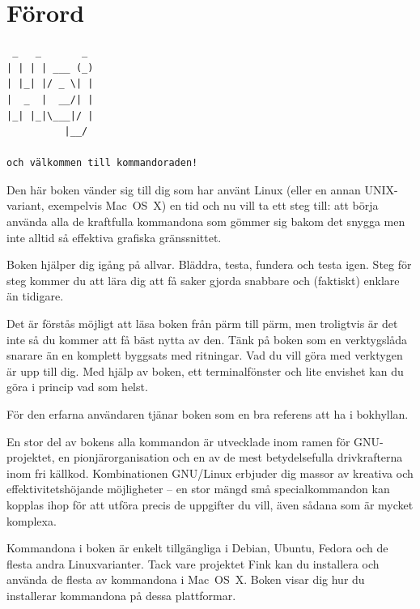 \documentclass[10pt,a4paper,final]{book}
\begin{document}
\newpage 

\pagestyle{plain}

\tableofcontents

\clearpage

\thispagestyle{empty}

\mainmatter

\chapter{Förord}

\begin{verbatim}
 _   _       _
| | | | ___ (_)
| |_| |/ _ \| |
|  _  |  __/| |
|_| |_|\___|/ |
          |__/ 

och välkommen till kommandoraden!
\end{verbatim}

Den här boken vänder sig till dig som har använt Linux (eller en annan UNIX-variant, exempelvis Mac~OS~X) en tid och nu vill ta ett steg till: att börja använda alla de kraftfulla kommandona som gömmer sig bakom det snygga men inte alltid så effektiva grafiska gränssnittet.

Boken hjälper dig igång på allvar. Bläddra, testa, fundera och testa igen. Steg för steg kommer du att lära dig att få saker gjorda snabbare och (faktiskt) enklare än tidigare. 

Det är förstås möjligt att läsa boken från pärm till pärm, men troligtvis är det inte så du kommer att få bäst nytta av den. Tänk på boken som en verktygslåda snarare än en komplett byggsats med ritningar. Vad du vill göra med verktygen är upp till dig. Med hjälp av boken, ett terminalfönster och lite envishet kan du göra i princip vad som helst.

För den erfarna användaren tjänar boken som en bra referens att ha i bokhyllan.

En stor del av bokens alla kommandon är utvecklade inom ramen för GNU-projektet, en pionjärorganisation och en av de mest betydelsefulla drivkrafterna inom fri källkod. Kombinationen GNU/Linux erbjuder dig massor av kreativa och effektivitetshöjande möjligheter -- en stor mängd små specialkommandon kan kopplas ihop för att utföra precis de uppgifter du vill, även sådana som är mycket komplexa. 

Kommandona i boken är enkelt tillgängliga i Debian, Ubuntu, Fedora och de flesta andra Linuxvarianter. Tack vare projektet Fink kan du installera och använda de flesta av kommandona i Mac~OS~X. Boken visar dig hur du installerar kommandona på dessa plattformar.
\end{document}
